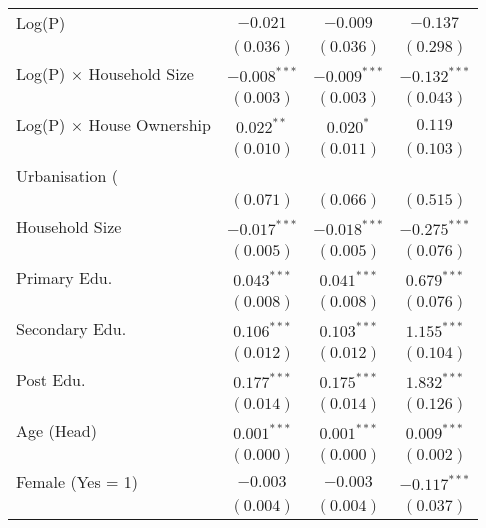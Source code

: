 \begin{table}[H]
\begin{center}
\begin{tabular}{l c c c}
Log(P)                               & $-0.021$       & $-0.009$       & $-0.137$         \\
                                     & $(0.036)$      & $(0.036)$      & $(0.298)$        \\
Log(P) $\times$ Household Size       & $-0.008^{***}$ & $-0.009^{***}$ & $-0.132^{***}$   \\
                                     & $(0.003)$      & $(0.003)$      & $(0.043)$        \\
Log(P) $\times$ House Ownership      & $0.022^{**}$   & $0.020^{*}$    & $0.119$          \\
                                     & $(0.010)$      & $(0.011)$      & $(0.103)$        \\
Urbanisation (\\%
                                     & $(0.071)$      & $(0.066)$      & $(0.515)$        \\
Household Size                       & $-0.017^{***}$ & $-0.018^{***}$ & $-0.275^{***}$   \\
                                     & $(0.005)$      & $(0.005)$      & $(0.076)$        \\
Primary Edu.                         & $0.043^{***}$  & $0.041^{***}$  & $0.679^{***}$    \\
                                     & $(0.008)$      & $(0.008)$      & $(0.076)$        \\
Secondary Edu.                       & $0.106^{***}$  & $0.103^{***}$  & $1.155^{***}$    \\
                                     & $(0.012)$      & $(0.012)$      & $(0.104)$        \\
Post Edu.                            & $0.177^{***}$  & $0.175^{***}$  & $1.832^{***}$    \\
                                     & $(0.014)$      & $(0.014)$      & $(0.126)$        \\
Age (Head)                           & $0.001^{***}$  & $0.001^{***}$  & $0.009^{***}$    \\
                                     & $(0.000)$      & $(0.000)$      & $(0.002)$        \\
Female (Yes = 1)                     & $-0.003$       & $-0.003$       & $-0.117^{***}$   \\
                                     & $(0.004)$      & $(0.004)$      & $(0.037)$        \\

\end{tabular}
\end{center}
\end{table}
